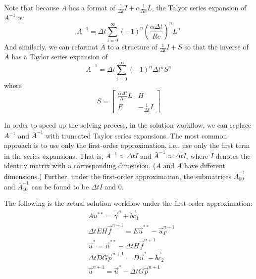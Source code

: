 Note that because $A$ has a format of $\frac{1}{\Delta t}I + \alpha \frac{1}{Re}L$, the Talyor series expansion of $A^{-1}$ is
\begin{equation}\label{eq:approx-A-inv}
    A^{-1} = \Delta t \sum\limits_{i=0}^{\infty} \left(-1\right)^{n}\left(\frac{\alpha\Delta t}{Re}\right)^n L^n
\end{equation}
And similarly, we can reformat $\bar{A}$ to a structure of $\frac{1}{\Delta t}I + S$ so that the inverse of $\bar{A}$ has a Taylor series expansion of
\begin{equation}\label{eq:approx-A-bar-inv}
    \bar{A}^{-1} = \Delta t \sum\limits_{i=0}^{\infty}\left(-1\right)^{n}\Delta t^n S^n
\end{equation}
where
\begin{equation}
    S = \begin{bmatrix}
        \frac{\alpha \Delta t}{Re}L & H \\
        E & -\frac{1}{\Delta t}I
    \end{bmatrix}
\end{equation}

In order to speed up the solving process, in the solution workflow, we can replace $A^{-1}$ and $\bar{A}^{-1}$ with truncated Taylor series expansions.
The most common approach is to use only the first-order approximation, i.e., use only the first term in the series expansions.
That is, $A^{-1} \approx \Delta t I$ and $\bar{A}^{-1} \approx \Delta t I$, where $I$ denotes the identity matrix with a corresponding dimension. ($A$ and $\bar{A}$ have different dimensions.)
Further, under the first-order approximation, the submatrices $\bar{A}_{00}^{-1}$ and $\bar{A}_{10}^{-1}$ can be found to be $\Delta t I$ and $0$.

The following is the actual solution workflow under the first-order approximation:
\begin{subequations}\label{eq:dibpm-first-order}
    \begin{align}
        & A u^{* *} = \vec{\gamma}^n + \vec{bc}_1\label{eq:dibpm-order2-1} \\
        & \Delta t EH \vec{f}^{n+1} = E \vec{u}^{* *} - \vec{u}_\Gamma^{n+1}\label{eq:dibpm-order2-2} \\
        & \vec{u}^* = \vec{u}^{* *} - \Delta t H \vec{f}^{n+1}\label{eq:dibpm-order2-3}\\
        & \Delta t DG \vec{p}^{n+1} = D \vec{u}^* - \vec{bc}_2\label{eq:dibpm-order2-4} \\
        & \vec{u}^{n+1} = \vec{u}^* - \Delta t G \vec{p}^{n+1}\label{eq:dibpm-order2-5}
    \end{align}
\end{subequations}

